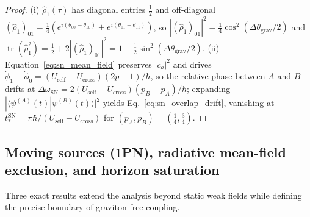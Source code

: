 \documentclass[aps,prd,onecolumn,tightenlines,nofootinbib,notitlepage,10pt,floatfix]{revtex4-2}
\theoremstyle{indentedtheorem}
\begin{document}
\begin{proof}
(i) $\hat{\rho}_1(\tau)$ has diagonal entries $\tfrac{1}{2}$ and off-diagonal $(\hat{\rho}_1)_{01}=\tfrac{1}{4}(e^{i(\theta_{00}-\theta_{10})}+e^{i(\theta_{01}-\theta_{11})})$, so $|(\hat{\rho}_1)_{01}|^2=\tfrac{1}{4}\cos^2(\Delta\theta_\text{grav}/2)$ and $\operatorname{tr}(\hat{\rho}_1^2)=\tfrac{1}{2}+2|(\hat{\rho}_1)_{01}|^2=1-\tfrac{1}{2}\sin^2(\Delta\theta_\text{grav}/2)$.
(ii) Equation~\eqref{eq:sn_mean_field} preserves $|c_a|^2$ and drives $\dot{\phi}_1-\dot{\phi}_0=(U_\text{self}-U_\text{cross})(2p-1)/\hbar$, so the relative phase between $A$ and $B$ drifts at $\Delta\omega_\text{SN}=2(U_\text{self}-U_\text{cross})(p_B-p_A)/\hbar$; expanding $|\langle\psi^{(A)}(t)|\psi^{(B)}(t)\rangle|^2$ yields Eq.~\eqref{eq:sn_overlap_drift}, vanishing at $t_*^\text{SN}=\pi\hbar/(U_\text{self}-U_\text{cross})$ for $(p_A,p_B)=(\tfrac{1}{4},\tfrac{3}{4})$.
\end{proof}

\subsection{Moving sources (\texorpdfstring{$1$}{1}PN), radiative mean-field exclusion, and horizon saturation}
\label{sec:dynamical_gravity}

Three exact results extend the analysis beyond static weak fields while defining the precise boundary of graviton-free coupling.
\end{document}
